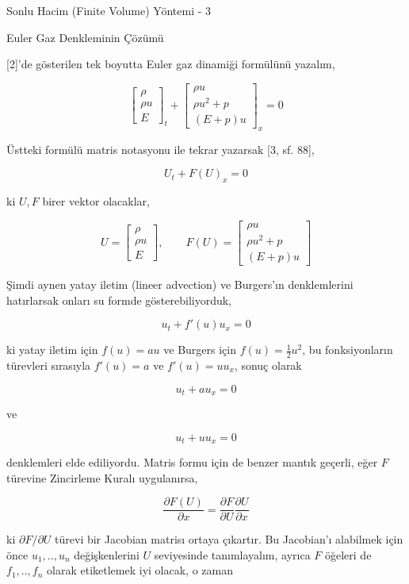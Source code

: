 \documentclass[12pt,fleqn]{article}\usepackage{../../common}
\begin{document}
Sonlu Hacim (Finite Volume) Yöntemi - 3

Euler Gaz Denkleminin Çözümü

[2]'de gösterilen tek boyutta Euler gaz dinamiği formülünü yazalım,

$$
\left[\begin{array}{c}
\rho \\ \rho u  \\ E
\end{array}\right]_t
+
\left[\begin{array}{c}
\rho u \\ \rho u^2 + p \\ (E+p) u 
\end{array}\right]_x 
= 0
$$

Üstteki formülü matris notasyonu ile tekrar yazarsak [3, sf. 88],

$$
U_t + F(U)_x = 0
$$

ki $U,F$ birer vektor olacaklar,

$$
U = \left[\begin{array}{c}
\rho \\ \rho u  \\ E
\end{array}\right], \qquad
F(U) =
\left[\begin{array}{c}
\rho u \\ \rho u^2 + p \\ (E+p) u 
\end{array}\right]
$$

Şimdi aynen yatay iletim (lineer advection) ve Burgers'ın denklemlerini
hatırlarsak onları su formde gösterebiliyorduk,

$$
u_t + f'(u) u_x = 0
$$

ki yatay iletim için $f(u) = au$ ve Burgers için $f(u) = \frac{1}{2} u^2$,
bu fonksiyonların türevleri sırasıyla $f'(u) = a$ ve $f'(u) = u u_x$,
sonuç olarak

$$
u_t + a u_x = 0
$$

ve

$$
u_t + u u_x = 0
$$

denklemleri elde ediliyordu. Matris formu için de benzer mantık geçerli,
eğer $F$ türevine Zincirleme Kuralı uygulanırsa,

$$
\frac{\partial F(U)}{\partial x} =
\frac{\partial F}{\partial U} \frac{\partial U}{\partial x}
$$

ki $\partial F / \partial U$ türevi bir Jacobian matrisı ortaya çıkartır. Bu
Jacobian'ı alabilmek için önce $u_1,..,u_n$ değişkenlerini $U$ seviyesinde
tanımlayalım, ayrıca $F$ öğeleri de $f_1,..,f_n$ olarak etiketlemek iyi
olacak, o zaman 
\end{document}
